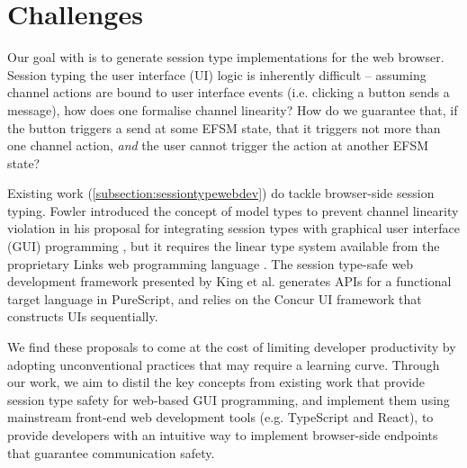 \section{Challenges}
Our goal with  is to
generate session type implementations for the web browser.
Session typing the user interface (UI) logic is inherently difficult --
assuming channel actions are bound to user interface events 
(i.e. clicking a button sends a message), how does one formalise
channel linearity? How do we guarantee that, if the button
triggers a send at some EFSM state, that it triggers not more than
one channel action, \textit{and} the user cannot trigger the action
at another EFSM state?

Existing work (\cref{subsection:sessiontypewebdev})
do tackle browser-side session typing.
Fowler introduced the concept of model types to prevent
channel linearity violation in his proposal for
integrating session types with
graphical user interface (GUI) programming \cite{MVU2020}, but
it requires the linear type system available from
the proprietary Links web programming language \cite{LINKS}.
The session type-safe web development framework presented
by King et al. \cite{PureScript2019} generates APIs for
a functional target language in PureScript, and relies on
the Concur UI framework that constructs UIs sequentially.

We find these proposals to come at the cost of
limiting developer productivity by adopting unconventional practices
that may require a learning curve.
Through our work, we aim to distil the key
concepts from existing work that provide session type safety
for web-based GUI programming, and implement them using
mainstream front-end web development tools (e.g. TypeScript
and React), to provide developers with an intuitive way to implement
browser-side endpoints that guarantee communication safety.
